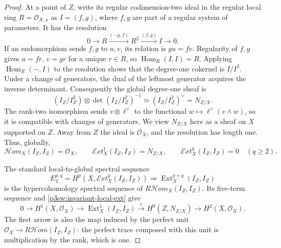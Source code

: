 \documentclass[11pt]{article}
\numberwithin{equation}{section}
\begin{document}
\begin{proof}
At a point of \(Z\), write its regular codimension-two ideal in the
regular local ring \(R=\mathcal O_{X,x}\) as \(I=(f,g)\), where \(f,g\)
are part of a regular system of parameters.  It has the resolution
\[
 0\longrightarrow R\xrightarrow{(-g,f)}R^2
   \xrightarrow{(f,g)}I\longrightarrow0.
\]
If an endomorphism sends \(f,g\) to \(u,v\), its relation is
\(gu=fv\).  Regularity of \(f,g\) gives \(u=fr\), \(v=gr\) for a
unique \(r\in R\), so \(\operatorname{Hom}_R(I,I)=R\).  Applying
\(\operatorname{Hom}_R(-,I)\) to the resolution shows that the degree-one
cokernel is \(I/I^2\).  Under a change of generators, the dual of the
leftmost generator acquires the inverse determinant.  Consequently the
global degree-one sheaf is
\[
 (I_Z/I_Z^2)\otimes\det(I_Z/I_Z^2)^{-1}
 \simeq (I_Z/I_Z^2)^\vee=N_{Z/X}.
\]
The rank-two isomorphism sends \(v\otimes\ell^\vee\) to the functional
\(w\mapsto\ell^\vee(v\wedge w)\), so it is compatible with changes of
generators.  We view \(N_{Z/X}\) here as a sheaf on \(X\) supported on
\(Z\).  Away from \(Z\) the ideal is \(\mathcal O_X\), and the resolution
has length one.  Thus, globally,
\begin{equation}\label{p3sw:invariant-local-ext}
 \mathcal{H}om_X(I_Z,I_Z)=\mathcal O_X,\qquad
 \mathcal{E}xt_X^1(I_Z,I_Z)=N_{Z/X},\qquad
 \mathcal{E}xt_X^q(I_Z,I_Z)=0\quad(q\geq2).
\end{equation}

The standard local-to-global spectral sequence
\[
 E_2^{p,q}=H^p\!\left(X,\mathcal{E}xt_X^q(I_Z,I_Z)\right)
 \Longrightarrow \operatorname{Ext}^{p+q}_X(I_Z,I_Z)
\]
is the hypercohomology spectral sequence of
\(R\mathcal{H}om_X(I_Z,I_Z)\).  Its five-term sequence and
\eqref{p3sw:invariant-local-ext} give
\begin{equation}\label{p3sw:invariant-local-global}
 0\longrightarrow H^1(X,\mathcal O_X)
 \longrightarrow\operatorname{Ext}^1_X(I_Z,I_Z)
 \xrightarrow{\,e\,}H^0(Z,N_{Z/X})
 \longrightarrow H^2(X,\mathcal O_X).
\end{equation}
The first arrow is also the map induced by the perfect unit
\(\mathcal O_X\to R\mathcal{H}om(I_Z,I_Z)\): the perfect trace composed
with this unit is multiplication by the rank, which is one.


\end{proof}
\end{document}
